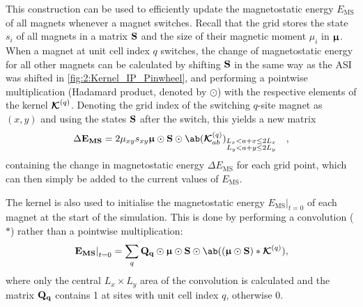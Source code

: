This construction can be used to efficiently update the magnetostatic energy $E_\mathrm{MS}$ of all magnets whenever a magnet switches.
Recall that the grid stores the state $s_i$ of all magnets in a matrix $\boldsymbol{\mathbf{S}}$ and the size of their magnetic moment $\mu_i$ in $\boldsymbol{\mathbf{\upmu}}$.
When a magnet at unit cell index $q$ switches, the change of magnetostatic energy for all other magnets can be calculated by shifting $\boldsymbol{\mathbf{S}}$ in the same way as the ASI was shifted in \cref{fig:2:Kernel_IP_Pinwheel}, and performing a pointwise multiplication (Hadamard product, denoted by $\odot$) with the respective elements of the kernel $\boldsymbol{\mathbf{\mathcal{K}}}^{(q)}$.
Denoting the grid index of the switching $q$-site magnet as $(x,y)$ and using the states $\boldsymbol{\mathbf{S}}$ after the switch, this yields a new matrix
\begin{equation}
	\label{eq:2:Kernel_update}
	\Delta \vc{E_\mathrm{MS}} = 2\mu_{xy} s_{xy}\vc{\upmu} \odot \vc{S} \odot \ab(\vc{\mathcal{K}}^{(q)}_{ab})_{\substack{L_x < a + x \leq 2L_x \\ L_y < a + y \leq 2L_y}} \quad\mathrm{,}
\end{equation}
containing the change in magnetostatic energy $\Delta E_\mathrm{MS}$ for each grid point, which can then simply be added to the current values of $E_\mathrm{MS}$. \par
The kernel is also used to initialise the magnetostatic energy $\left. E_\mathrm{MS} \right|_{t=0}$ of each magnet at the start of the simulation.
This is done by performing a convolution ($*$) rather than a pointwise multiplication:
\begin{equation}
	\label{eq:2:Kernel_init}
	\left. \vc{E_\mathrm{MS}} \right|_{t=0} = \sum_q \vc{Q_q} \odot \vc{\upmu} \odot \vc{S} \odot \ab((\vc{\upmu} \odot \vc{S}) * \vc{\mathcal{K}}^{(q)}) \mathrm{,}
\end{equation}
where only the central $L_x \times L_y$ area of the convolution is calculated and the matrix $\boldsymbol{\mathbf{Q_q}}$ contains 1 at sites with unit cell index $q$, otherwise 0. \\\par

